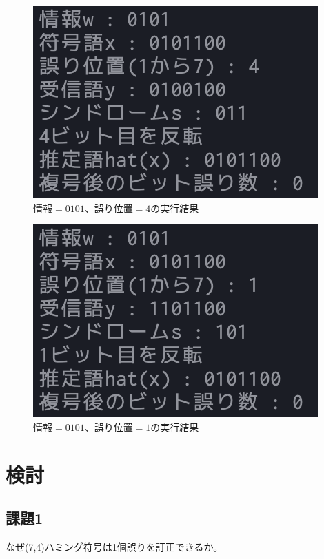 \documentclass[12pt]{jarticle}
\begin{document}
\begin{figure}[h]
    \begin{center}
        \includegraphics[scale=0.8]{kadai3_2_1.png}
    \end{center}
    \caption{$情報=0101$、$誤り位置=4$の実行結果}
\end{figure}
\clearpage
\begin{figure}[h]
    \begin{center}
        \includegraphics[scale=0.8]{kadai3_2_2.png}
    \end{center}
    \caption{$情報=0101$、$誤り位置=1$の実行結果}
\end{figure}

\section{検討}
\subsection{課題1}
\begin{shadebox}
    なぜ(7,4)ハミング符号は1個誤りを訂正できるか。
\end{shadebox}
\end{document}
